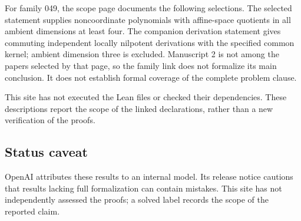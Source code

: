 \documentclass[11pt]{article}
\begin{document}
For family 049, the scope page documents the following selections. The selected statement supplies noncoordinate polynomials with affine-space quotients in all ambient dimensions at least four. The companion derivation statement gives commuting independent locally nilpotent derivations with the specified common kernel; ambient dimension three is excluded. Manuscript 2 is not among the papers selected by that page, so the family link does not formalize its main conclusion. It does not establish formal coverage of the complete problem clause.

This site has not executed the Lean files or checked their dependencies. These descriptions report the scope of the linked declarations, rather than a new verification of the proofs.

\subsection{Status caveat}
OpenAI attributes these results to an internal model. Its release notice cautions that results lacking full formalization can contain mistakes. This site has not independently assessed the proofs; a solved label records the scope of the reported claim.
\end{document}
